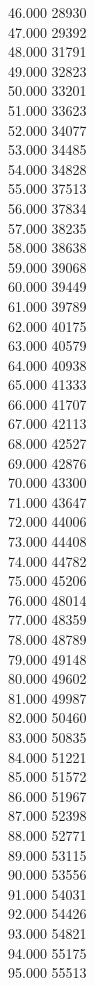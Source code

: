{ 46.000	28930 \\
 47.000	29392 \\
 48.000	31791 \\
 49.000	32823 \\
 50.000	33201 \\
 51.000	33623 \\
 52.000	34077 \\
 53.000	34485 \\
 54.000	34828 \\
 55.000	37513 \\
 56.000	37834 \\
 57.000	38235 \\
 58.000	38638 \\
 59.000	39068 \\
 60.000	39449 \\
 61.000	39789 \\
 62.000	40175 \\
 63.000	40579 \\
 64.000	40938 \\
 65.000	41333 \\
 66.000	41707 \\
 67.000	42113 \\
 68.000	42527 \\
 69.000	42876 \\
 70.000	43300 \\
 71.000	43647 \\
 72.000	44006 \\
 73.000	44408 \\
 74.000	44782 \\
 75.000	45206 \\
 76.000	48014 \\
 77.000	48359 \\
 78.000	48789 \\
 79.000	49148 \\
 80.000	49602 \\
 81.000	49987 \\
 82.000	50460 \\
 83.000	50835 \\
 84.000	51221 \\
 85.000	51572 \\
 86.000	51967 \\
 87.000	52398 \\
 88.000	52771 \\
 89.000	53115 \\
 90.000	53556 \\
 91.000	54031 \\
 92.000	54426 \\
 93.000	54821 \\
 94.000	55175 \\
 95.000	55513 \\
}
